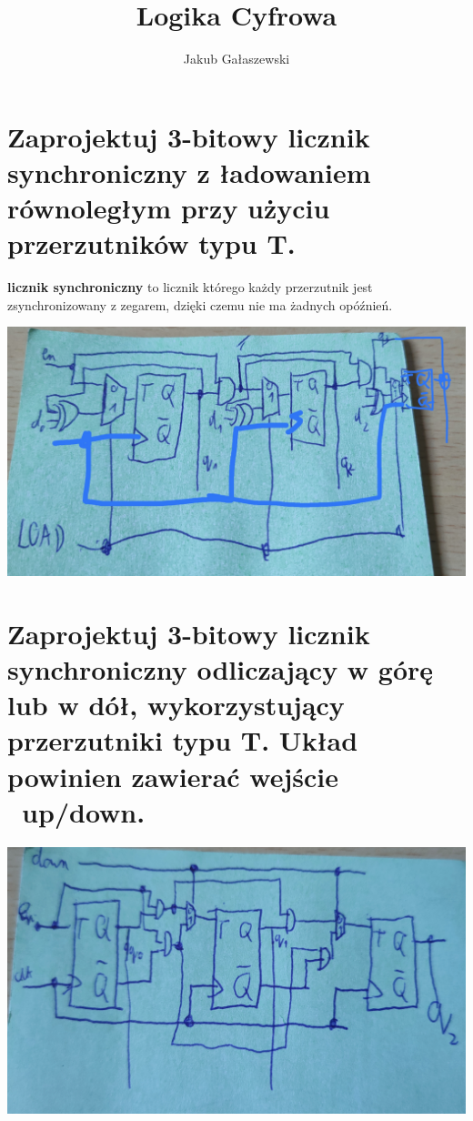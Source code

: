 \documentclass{article}
\title{Logika Cyfrowa}
\author{Jakub Gałaszewski}
\begin{document}
\maketitle
\section{Zaprojektuj 3-bitowy licznik synchroniczny z ładowaniem równoległym przy użyciu przerzutników typu T.}
\textbf{licznik synchroniczny} to licznik którego każdy przerzutnik jest zsynchronizowany z zegarem, dzięki czemu nie ma żadnych opóźnień.\\
\begin{center}
\includegraphics[scale=0.1]{./L07Z01.jpg}
\end{center}
\section{Zaprojektuj 3-bitowy licznik synchroniczny odliczający w górę lub w dół, wykorzystujący przerzutniki typu T. Układ powinien zawierać wejście ~up/down.}
\begin{center}
\includegraphics[scale=0.07]{./L07Z02.jpg}
\end{center}
\end{document}
